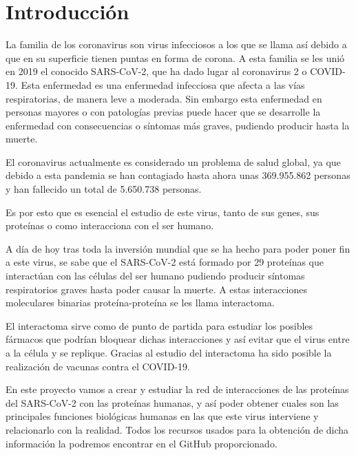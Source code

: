 \section{Introducción}
La familia de los coronavirus son virus infecciosos a los que se llama así debido a que en su superficie tienen puntas en forma de corona. A esta familia se les unió en 2019 el conocido SARS-CoV-2, que ha dado lugar al coronavirus 2 o COVID-19. Esta enfermedad es una enfermedad infecciosa que afecta a las vías respiratorias, de manera leve a moderada. Sin embargo esta enfermedad en personas mayores o con patologías previas puede hacer que se desarrolle la enfermedad con consecuencias o síntomas más graves, pudiendo producir hasta la muerte.

El coronavirus actualmente es considerado un problema de salud global, ya que debido a esta pandemia se han contagiado hasta ahora unas 369.955.862 personas y han fallecido un total de 5.650.738 personas. 

Es por esto que es esencial el estudio de este virus, tanto de sus genes, sus proteínas o como interacciona con el ser humano. 

A día de hoy tras toda la inversión mundial que se ha hecho para poder poner fin a este virus, se sabe que el SARS-CoV-2 está formado por 29 proteínas que interactúan con las células del ser humano pudiendo producir síntomas respiratorios graves hasta poder causar la muerte. A estas interacciones moleculares binarias proteína-proteína se les llama interactoma. 

El interactoma sirve como de punto de partida para estudiar los posibles fármacos que podrían bloquear dichas interacciones y así evitar que el virus entre a la célula y se replique. Gracias al estudio del interactoma ha sido posible la realización de vacunas contra el COVID-19. 

En este proyecto vamos a crear y estudiar la red de interacciones de las proteínas del SARS-CoV-2 con las proteínas humanas, y así poder obtener cuales son las principales funciones biológicas humanas en las que este virus interviene y relacionarlo con la realidad. Todos los recursos usados para la obtención de dicha información la podremos encontrar en el GitHub proporcionado. 


